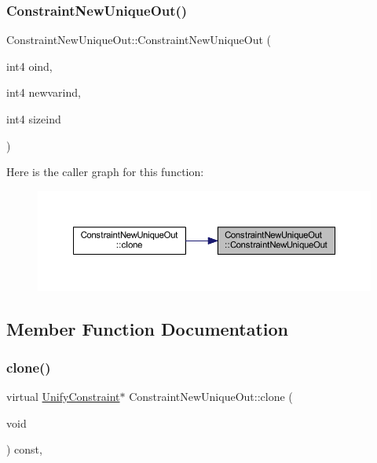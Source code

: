 \subsubsection{\texorpdfstring{ConstraintNewUniqueOut()}{ConstraintNewUniqueOut()}}
{\footnotesize\ttfamily Constraint\+New\+Unique\+Out\+::\+Constraint\+New\+Unique\+Out (\begin{DoxyParamCaption}\item[{int4}]{oind,  }\item[{int4}]{newvarind,  }\item[{int4}]{sizeind }\end{DoxyParamCaption})}

Here is the caller graph for this function\+:
\nopagebreak
\begin{figure}[H]
\begin{center}
\leavevmode
\includegraphics[width=350pt]{class_constraint_new_unique_out_a2dd7fe7d8a581f94c2894050183844a0_icgraph}
\end{center}
\end{figure}


\subsection{Member Function Documentation}
\mbox{\label{class_constraint_new_unique_out_a5c430b42eee12168f0e542f4be6e766b}} 
\subsubsection{\texorpdfstring{clone()}{clone()}}
{\footnotesize\ttfamily virtual \mbox{\hyperlink{class_unify_constraint}{Unify\+Constraint}}$\ast$ Constraint\+New\+Unique\+Out\+::clone (\begin{DoxyParamCaption}\item[{void}]{ }\end{DoxyParamCaption}) const\hspace{0.3cm}{\ttfamily [inline]}, {\ttfamily [virtual]}}




